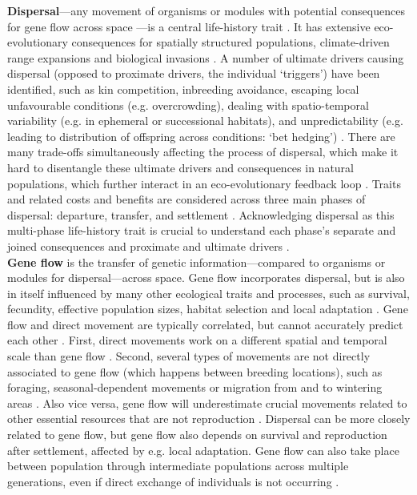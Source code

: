 \documentclass[10pt, twoside]{book} %
\begin{document}
	\textbf{Dispersal}---any movement of organisms or modules with potential consequences for gene flow across space \citep{ronce2007}---is a central life-history trait \citep{bonte2017}. It has extensive eco-evolutionary consequences for spatially structured populations, climate-driven range expansions and biological invasions \citep{bowler2005}. A number of ultimate drivers causing dispersal (opposed to proximate drivers, the individual `triggers') have been identified, such as kin competition, inbreeding avoidance, escaping local unfavourable conditions (e.g. overcrowding), dealing with spatio-temporal variability (e.g. in ephemeral or successional habitats), and unpredictability (e.g. leading to distribution of offspring across conditions: `bet hedging') \citep{bowler2005, matthysen2012}. There are many trade-offs simultaneously affecting the process of dispersal, which make it hard to disentangle these ultimate drivers and consequences in natural populations, which further interact in an eco-evolutionary feedback loop \citep{bonte2012, starrfelt2012}. Traits and related costs and benefits are considered across three main phases of dispersal: departure, transfer, and settlement \citep{clobert2009, bonte2012}. Acknowledging dispersal as this multi-phase life-history trait is crucial to understand each phase's separate and joined consequences and proximate and ultimate drivers \citep{bonte2012}.\\
	
	\textbf{Gene flow} is the transfer of genetic information---compared to organisms or modules for dispersal---across space. Gene flow incorporates dispersal, but is also in itself influenced by many other ecological traits and processes, such as survival, fecundity, effective population sizes, habitat selection and local adaptation \citep{spear2010}. Gene flow and direct movement are typically correlated, but cannot accurately predict each other \citep{bohonak1999, whitlock1999, spear2010}. First, direct movements work on a different spatial and temporal scale than gene flow \citep{anderson2010}. Second, several types of movements are not directly associated to gene flow (which happens between breeding locations), such as foraging, seasonal-dependent movements or migration from and to wintering areas \citep{pilliod2002, friesen2007, cushman2010a}. Also vice versa, gene flow will underestimate crucial movements related to other essential resources that are not reproduction \citep{anderson2010, spear2010}. Dispersal can be more closely related to gene flow, but gene flow also depends on survival and reproduction after settlement, affected by e.g. local adaptation. Gene flow can also take place between population through intermediate populations across multiple generations, even if direct exchange of individuals is not occurring \citep{spear2010}.\\
	
\end{document}
